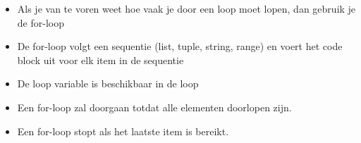 \begin{itemize}
\item Als je van te voren weet hoe vaak je door een loop moet lopen, dan gebruik je de for-loop
\item De for-loop volgt een sequentie (list, tuple, string, range) en voert het code block uit voor elk item in de sequentie
\item De loop variable is beschikbaar in de loop
\item Een for-loop zal doorgaan totdat alle elementen doorlopen zijn. 
\item Een for-loop stopt als het laatste item is bereikt.
\end{itemize}
